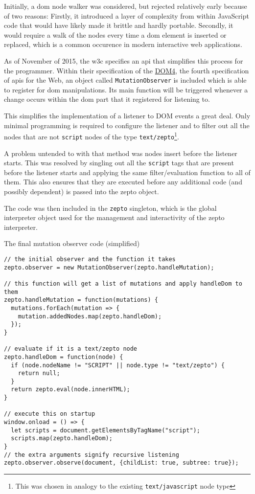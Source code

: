 \documentclass[oneside,11pt,xetex]{scrbook}
\begin{document}
Initially, a \gls{dom} node walker was considered, but rejected relatively early because of two reasons:
Firstly, it introduced a layer of complexity from within JavaScript code that would have likely made
it brittle and hardly portable. Secondly, it would require a walk of the nodes every time a \gls{dom}
element is inserted or replaced, which is a common occurence in modern interactive web applications.

As of November of 2015, the \gls{w3c} specifies an \gls{api} that simplifies this process for the programmer.
Within their specification of the \href{https://www.w3.org/TR/dom/#mutationobserver}{DOM4}, the fourth
specification of \gls{api}s for the Web, an object called \texttt{MutationObserver} is included which
is able to register for \gls{dom} manipulations. Its main function will be triggered whenever a change
occurs within the \gls{dom} part that it registered for listening to.

This simplifies the implementation of a listener to DOM events a great deal. Only minimal programming
is required to configure the listener and to filter out all the nodes that are not \texttt{script} nodes
of the type \texttt{text/zepto}\footnote{This was chosen in analogy to the existing \texttt{text/javascript}
node type}.

A problem untended to with that method was nodes insert before the listener starts. This was resolved by
singling out all the \texttt{script} tags that are present before the listener starts and applying the
same filter/evaluation function to all of them. This also ensures that they are executed before any
additional code (and possibly dependent) is passed into the zepto object.

The code was then included in the \texttt{zepto} singleton, which is the global interpreter object
used for the management and interactivity of the zepto interpreter.

\begin{listing}[H]
\caption{The final mutation observer code (simplified)}
\begin{verbatim}
// the initial observer and the function it takes
zepto.observer = new MutationObserver(zepto.handleMutation);

// this function will get a list of mutations and apply handleDom to them
zepto.handleMutation = function(mutations) {
  mutations.forEach(mutation => {
    mutation.addedNodes.map(zepto.handleDom);
  });
}

// evaluate if it is a text/zepto node
zepto.handleDom = function(node) {
  if (node.nodeName != "SCRIPT" || node.type != "text/zepto") {
    return null;
  }
  return zepto.eval(node.innerHTML);
}

// execute this on startup
window.onload = () => {
  let scripts = document.getElementsByTagName("script");
  scripts.map(zepto.handleDom);
}
// the extra arguments signify recursive listening
zepto.observer.observe(document, {childList: true, subtree: true});
\end{verbatim}
\end{listing}
\end{document}
